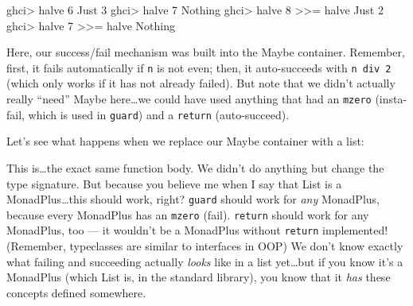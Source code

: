 \documentclass[]{article}
\newenvironment{Shaded}{}{}
\newcommand{\CommentTok}[1]{\textcolor[rgb]{0.38,0.63,0.69}{\textit{#1}}}
\newcommand{\DataTypeTok}[1]{\textcolor[rgb]{0.56,0.13,0.00}{#1}}
\newcommand{\DecValTok}[1]{\textcolor[rgb]{0.25,0.63,0.44}{#1}}
\newcommand{\FunctionTok}[1]{\textcolor[rgb]{0.02,0.16,0.49}{#1}}
\newcommand{\KeywordTok}[1]{\textcolor[rgb]{0.00,0.44,0.13}{\textbf{#1}}}
\newcommand{\NormalTok}[1]{#1}
\newcommand{\OperatorTok}[1]{\textcolor[rgb]{0.40,0.40,0.40}{#1}}
\newcommand{\OtherTok}[1]{\textcolor[rgb]{0.00,0.44,0.13}{#1}}
\begin{document}
\begin{Shaded}
\begin{Highlighting}[]
\NormalTok{ghci}\OperatorTok{\textgreater{}}\NormalTok{ halve }\DecValTok{6}
\DataTypeTok{Just} \DecValTok{3}
\NormalTok{ghci}\OperatorTok{\textgreater{}}\NormalTok{ halve }\DecValTok{7}
\DataTypeTok{Nothing}
\NormalTok{ghci}\OperatorTok{\textgreater{}}\NormalTok{ halve }\DecValTok{8} \OperatorTok{\textgreater{}\textgreater{}=}\NormalTok{ halve}
\DataTypeTok{Just} \DecValTok{2}
\NormalTok{ghci}\OperatorTok{\textgreater{}}\NormalTok{ halve }\DecValTok{7} \OperatorTok{\textgreater{}\textgreater{}=}\NormalTok{ halve}
\DataTypeTok{Nothing}
\end{Highlighting}
\end{Shaded}

Here, our success/fail mechanism was built into the Maybe container. Remember,
first, it fails automatically if \texttt{n} is not even; then, it auto-succeeds
with \texttt{n\ \textasciigrave{}div\textasciigrave{}\ 2} (which only works if
it has not already failed). But note that we didn't actually really ``need''
Maybe here\ldots we could have used anything that had an \texttt{mzero}
(insta-fail, which is used in \texttt{guard}) and a \texttt{return}
(auto-succeed).

Let's see what happens when we replace our Maybe container with a list:

\begin{Shaded}
\end{Shaded}

This is\ldots the exact same function body. We didn't do anything but change the
type signature. But because you believe me when I say that List is a
MonadPlus\ldots this should work, right? \texttt{guard} should work for
\emph{any} MonadPlus, because every MonadPlus has an \texttt{mzero} (fail).
\texttt{return} should work for any MonadPlus, too --- it wouldn't be a
MonadPlus without \texttt{return} implemented! (Remember, typeclasses are
similar to interfaces in OOP) We don't know exactly what failing and succeeding
actually \emph{looks} like in a list yet\ldots but if you know it's a MonadPlus
(which List is, in the standard library), you know that it \emph{has} these
concepts defined somewhere.
\end{document}
